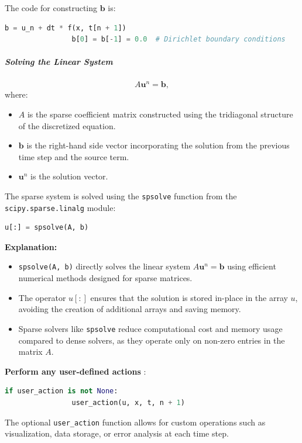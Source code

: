 \documentclass{article}
\begin{document}
			The code for constructing \( \mathbf{b} \) is:
			\begin{lstlisting}[language=Python]
				b = u_n + dt * f(x, t[n + 1])
				b[0] = b[-1] = 0.0  # Dirichlet boundary conditions
			\end{lstlisting}
			
			\subparagraph{Solving the Linear System}
			
			
			\[
			A \mathbf{u}^{n} = \mathbf{b},
			\]
			where:
			\begin{itemize}
				\item \( A \) is the sparse coefficient matrix constructed using the tridiagonal structure of the discretized equation.
				\item \( \mathbf{b} \) is the right-hand side vector incorporating the solution from the previous time step and the source term.
				\item \( \mathbf{u}^{n} \) is the solution vector.
			\end{itemize}
			
			The sparse system is solved using the \texttt{spsolve} function from the \texttt{scipy.sparse.linalg} module:
			\begin{lstlisting}[language=Python]
				u[:] = spsolve(A, b)
			\end{lstlisting}
			
			\textbf{Explanation:}
			\begin{itemize}
				\item \texttt{spsolve(A, b)} directly solves the linear system \( A \mathbf{u}^{n} = \mathbf{b} \) using efficient numerical methods designed for sparse matrices. 
				\item The operator \( u[:] \) ensures that the solution is stored in-place in the array \( u \), avoiding the creation of additional arrays and saving memory.
				\item Sparse solvers like \texttt{spsolve} reduce computational cost and memory usage compared to dense solvers, as they operate only on non-zero entries in the matrix \( A \).
			\end{itemize}
			
			
			\textbf{Perform any user-defined actions} :
			
			\begin{lstlisting}[language=Python]
				if user_action is not None:
				user_action(u, x, t, n + 1)
			\end{lstlisting}
			The optional \texttt{user\_action} function allows for custom operations such as visualization, data storage, or error analysis at each time step.
			
\end{document}
